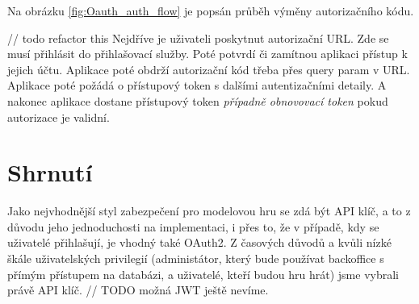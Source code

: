 Na obrázku \ref{fig:Oauth_auth_flow} je popsán průběh výměny autorizačního kódu.

// todo refactor this
Nejdříve je uživateli poskytnut autorizační URL. Zde se musí přihlásit do přihlašovací služby. Poté potvrdí či zamítnou aplikaci přístup k jejich účtu. Aplikace poté obdrží autorizační kód třeba přes query param %
v URL. Aplikace poté požádá o přístupový token s dalšími autentizačními detaily. A nakonec aplikace dostane přístupový token \textit{případně obnovovací token} pokud autorizace je validní.


\section{Shrnutí}
Jako nejvhodnější styl zabezpečení pro modelovou hru se zdá být API klíč, a to z důvodu jeho jednoduchosti na implementaci, i přes to, že v případě, kdy se uživatelé přihlašují, je vhodný také OAuth2. Z časových důvodů a kvůli nízké škále uživatelských privilegií (administátor, který bude používat backoffice s přímým přístupem na databázi, a uživatelé, kteří budou hru hrát) jsme vybrali právě API klíč. // TODO možná JWT ještě nevíme.


